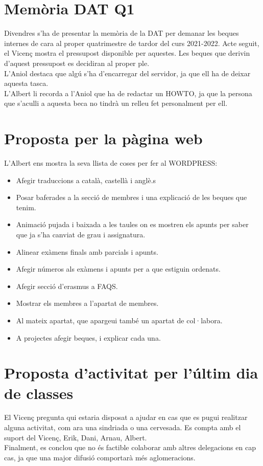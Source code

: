\documentclass[12 pt,a4paper]{article}
\begin{document}
\section{Memòria DAT Q1}

Divendres s’ha de presentar la memòria de la DAT per demanar les beques internes de cara al proper quatrimestre de tardor del curs 2021-2022. Acte seguit, el Vicenç mostra el pressupost disponible per aquestes. Les beques que derivin d’aquest pressupost es decidiran al proper ple.\\
L’Aniol destaca que algú s’ha d’encarregar del servidor, ja que ell ha de deixar aquesta tasca.\\
L’Albert li recorda a l'Aniol que ha de redactar un HOWTO, ja que la persona que s'aculli a aquesta beca no tindrà un relleu fet personalment per ell.

\section{Proposta per la pàgina web}

L'Albert ens mostra la seva llista de coses per fer al WORDPRESS:
\begin{itemize}
	\item Afegir traduccions a català, castellà i anglè.s
	\item Posar baferades a la secció de membres i  una explicació de les beques que tenim.
	\item Animació pujada i baixada a les taules on es mostren els apunts per saber que ja s'ha canviat de grau i assignatura.
	\item Alinear exàmens finals amb parcials i apunts.
	\item Afegir números als exàmens i apunts per a que estiguin ordenats. 
	\item Afegir secció d'erasmus a FAQS.
	\item Mostrar els membres a l'apartat de membres. 
	\item Al mateix apartat, que apargeui també un apartat de col·labora.
	\item A projectes afegir beques, i explicar cada una.
\end{itemize}

\section{Proposta d'activitat per l'últim dia de classes}

El Vicenç pregunta qui estaria disposat a ajudar en cas que es pugui realitzar alguna activitat, com ara una sindriada o una cervesada. Es compta amb el suport del Vicenç, Erik, Dani, Arnau, Albert.\\
Finalment, es conclou que no és factible colaborar amb altres delegacions en cap cas, ja que una major difusió comportarà més aglomeracions.
\end{document}

